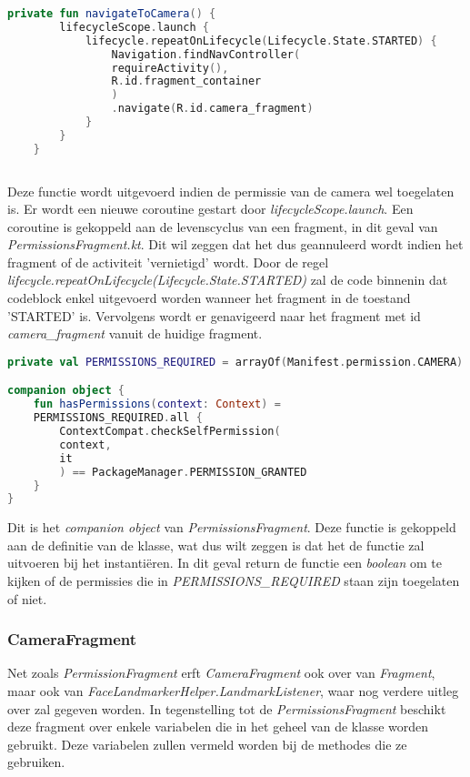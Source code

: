 \begin{lstlisting}[language=Kotlin, caption=navigateToCamera() in PermissionsFragment.kt]
    private fun navigateToCamera() {
        lifecycleScope.launch {
            lifecycle.repeatOnLifecycle(Lifecycle.State.STARTED) {
                Navigation.findNavController(
                requireActivity(),
                R.id.fragment_container
                )
                .navigate(R.id.camera_fragment)
            }
        }
    }
    
\end{lstlisting}
Deze functie wordt uitgevoerd indien de permissie van de camera wel toegelaten is. Er wordt een nieuwe coroutine gestart door \emph{lifecycleScope.launch}. Een coroutine is gekoppeld aan de levenscyclus van een fragment, in dit geval van \emph{PermissionsFragment.kt}. Dit wil zeggen dat het dus geannuleerd wordt indien het fragment of de activiteit 'vernietigd' wordt. Door de regel \emph{lifecycle.repeatOnLifecycle(Lifecycle.State.STARTED)} zal de code binnenin dat codeblock enkel uitgevoerd worden wanneer het fragment in de toestand 'STARTED' is. Vervolgens wordt er genavigeerd naar het fragment met id \emph{camera\_fragment} vanuit de huidige fragment.

\begin{lstlisting}[language=Kotlin, caption=companion object van PermissionsFragment.kt, label={lst:companionPermssion}]
private val PERMISSIONS_REQUIRED = arrayOf(Manifest.permission.CAMERA)

companion object {
    fun hasPermissions(context: Context) =
    PERMISSIONS_REQUIRED.all {
        ContextCompat.checkSelfPermission(
        context,
        it
        ) == PackageManager.PERMISSION_GRANTED
    }
}
\end{lstlisting}
Dit is het \emph{companion object} van \emph{PermissionsFragment}. Deze functie is gekoppeld aan de definitie van de klasse, wat dus wilt zeggen is dat het de functie zal uitvoeren bij het instantiëren. In dit geval return de functie een \emph{boolean} om te kijken of de permissies die in \emph{PERMISSIONS\_REQUIRED} staan zijn toegelaten of niet.

\subsubsection{CameraFragment}
Net zoals \emph{PermissionFragment} erft \emph{CameraFragment} ook over van \emph{Fragment}, maar ook van \emph{FaceLandmarkerHelper.LandmarkListener}, waar nog verdere uitleg over zal gegeven worden.
In tegenstelling tot de \emph{PermissionsFragment} beschikt deze fragment over enkele variabelen die in het geheel van de klasse worden gebruikt. Deze variabelen zullen vermeld worden bij de methodes die ze gebruiken.

